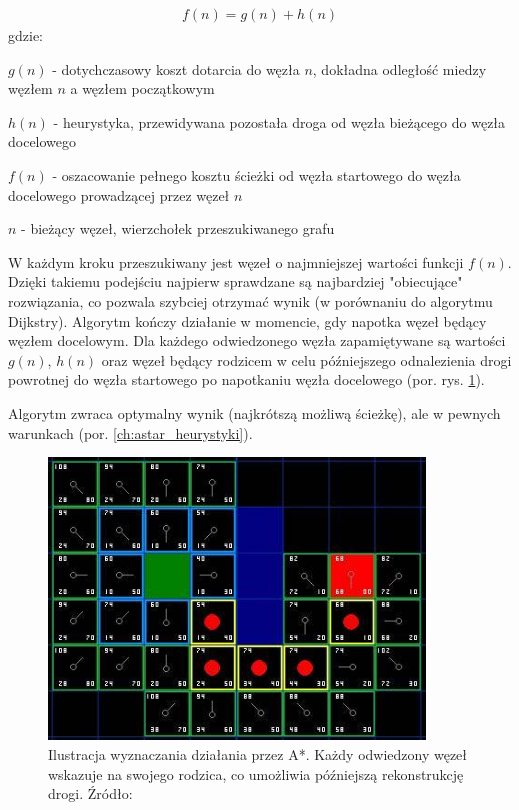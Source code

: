 \begin{gather}
 	f(n) = g(n) + h(n)
 	\label{eq_astar} 
\end{gather}
 gdzie:

 $g(n)$ - dotychczasowy koszt dotarcia do węzła $n$, dokładna odległość miedzy węzłem $n$ a węzłem początkowym

 $h(n)$ - heurystyka, przewidywana pozostała droga od węzła bieżącego do węzła docelowego

 $f(n)$ - oszacowanie pełnego kosztu ścieżki od węzła startowego do węzła docelowego prowadzącej przez węzeł $n$

 $n$ - bieżący węzeł, wierzchołek przeszukiwanego grafu

W każdym kroku przeszukiwany jest węzeł o najmniejszej wartości funkcji $f(n)$.
Dzięki takiemu podejściu najpierw sprawdzane są najbardziej "obiecujące" rozwiązania, co pozwala szybciej otrzymać wynik (w porównaniu do algorytmu Dijkstry).
Algorytm kończy działanie w momencie, gdy napotka węzeł będący węzłem docelowym.
Dla każdego odwiedzonego węzła zapamiętywane są wartości $g(n)$, $h(n)$ oraz węzeł będący rodzicem w celu późniejszego odnalezienia drogi powrotnej do węzła startowego po napotkaniu węzła docelowego (por. rys. \ref{fig:image_astar2}).

Algorytm zwraca optymalny wynik (najkrótszą możliwą ścieżkę), ale w pewnych warunkach (por. \ref{ch:astar_heurystyki}).

\begin{figure}
	\centering
	\includegraphics[width=10cm]{img/astar-t7}
	\caption{Ilustracja wyznaczania działania przez A*. Każdy odwiedzony węzeł wskazuje na swojego rodzica, co umożliwia późniejszą rekonstrukcję drogi. Źródło: \cite{astar2}}
	\label{fig:image_astar2}
\end{figure}

